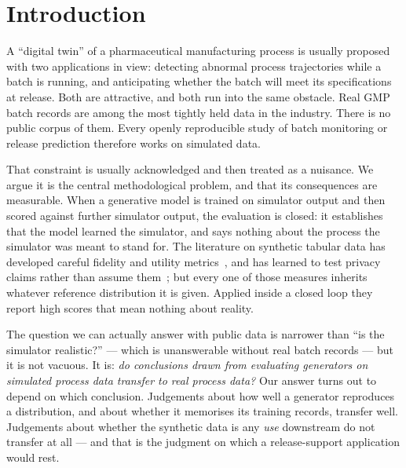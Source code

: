 \documentclass[11pt]{article}
\begin{document}
\section{Introduction}

A ``digital twin'' of a pharmaceutical manufacturing process is usually proposed
with two applications in view: detecting abnormal process trajectories while a
batch is running, and anticipating whether the batch will meet its
specifications at release. Both are attractive, and both run into the same
obstacle. Real GMP batch records are among the most tightly held data in the
industry. There is no public corpus of them. Every openly reproducible study of
batch monitoring or release prediction therefore works on simulated data.

That constraint is usually acknowledged and then treated as a nuisance. We argue
it is the central methodological problem, and that its consequences are
measurable. When a generative model is trained on simulator output and then
scored against further simulator output, the evaluation is closed: it establishes
that the model learned the simulator, and says nothing about the process the
simulator was meant to stand for. The literature on synthetic tabular data has
developed careful fidelity and utility metrics~\citep{alaa2022faithful}, and has
learned to test privacy claims rather than assume
them~\citep{stadler2022synthetic}; but every one of those measures inherits
whatever reference distribution it is given. Applied inside a closed loop they
report high scores that mean nothing about reality.

The question we can actually answer with public data is narrower than
``is the simulator realistic?'' --- which is unanswerable without real batch
records --- but it is not vacuous. It is: \emph{do conclusions drawn from
evaluating generators on simulated process data transfer to real process data?}
Our answer turns out to depend on which conclusion. Judgements about how well a
generator reproduces a distribution, and about whether it memorises its training
records, transfer well. Judgements about whether the synthetic data is any
\emph{use} downstream do not transfer at all --- and that is the judgment on
which a release-support application would rest.
\end{document}
